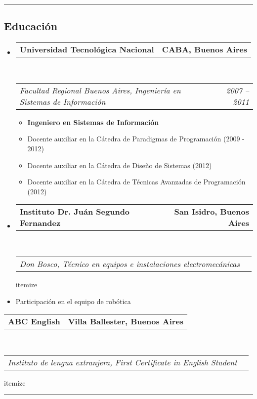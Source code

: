 \documentclass[11pt,4apaper]{article}
\makeatletter
\newcommand{\headerrow}[2]
{\begin{tabular*}{\linewidth}{l@{\extracolsep{\fill}}r}
#1 &
#2 \\
    \end{tabular*}}
\makeatother
\begin{document}
\hrule
\vspace{-0.4em}
    
    
    
    
\subsection*{Educación}

\begin{itemize}
\parskip=0.1em


\item 
\headerrow
{\textbf{Universidad Tecnológica Nacional}}
{\textbf{CABA, Buenos Aires}}
\\
\headerrow
{\emph{Facultad Regional Buenos Aires, Ingeniería en
    Sistemas de Información}} 
{\emph{2007 -- 2011}}
\begin{itemize}
  \item \textbf{Ingeniero en Sistemas de Información}
  \item Docente auxiliar en la Cátedra de Paradigmas de Programación (2009 - 2012)
  \item Docente auxiliar en la Cátedra de Diseño de Sistemas (2012)
  \item Docente auxiliar en la Cátedra de Técnicas Avanzadas de Programación (2012)
\end{itemize}

    \item 
    \headerrow
{\textbf{Instituto Dr. Juán Segundo Fernandez}}
{\textbf{San Isidro, Buenos Aires}}
\\
        \headerrow
{\emph{Don Bosco, Técnico en equipos e instalaciones electromecánicas}} 

\begin{itemize}
\item Participación en el equipo de robótica
\end{itemize}

\item 
\headerrow
{\textbf{ABC English}}
{\textbf{Villa Ballester, Buenos Aires}}
\\
        \headerrow
{\emph{Instituto de lengua extranjera, First Certificate in English Student}}


\end{itemize}


\hrule
\vspace{-0.4em}
\end{document}
